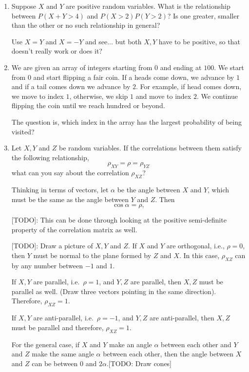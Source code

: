 \documentclass{amsart}
\theoremstyle{plain}
\numberwithin{equation}{section}
\begin{document}
\begin{enumerate}
\item Suppose $X$ and $Y$ are positive 
random variables. What is the relationship between
$P(X+Y>4)$ and $P(X>2)P(Y>2)$? Is one greater, smaller
than the other or no such relationship in general?

Use $X=Y$ and $X=-Y$ and see... but both $X,Y$ 
have to be positive, so that doesn't really work or does it?

\item We are given an array of integers starting 
from $0$ and ending at $100$. We start from $0$ and 
start flipping a fair coin. If a heads come down, 
we advance by $1$ and if a tail comes down 
we advance by $2$. For example, if head comes down, we move
to index $1$, otherwise, we skip $1$ and move to index $2$. 
We continue flipping the coin until we 
reach hundred or beyond. 

The question is, which index in the array has the 
largest probability of being visited?  


 
\item Let $X, Y$ and $Z$ be random 
variables. If the correlations between 
them satisfy the following relationship,
$$\rho_{XY} = \rho = \rho_{YZ}$$
what can you say about the correlation
$\rho_{XZ}$?

Thinking in terms of vectors, let $\alpha$ be 
the angle between $X$ and $Y$, which must be the 
same as the angle between $Y$ and $Z$. Then
$$\cos \alpha = \rho,$$

[TODO]: This can be done through looking at
the positive semi-definite property of the correlation matrix as 
well.

[TODO]: Draw a picture of $X, Y$ and $Z$.
If $X$ and $Y$ are orthogonal, i.e., $\rho = 0$, 
then $Y$ must be normal to the plane 
formed by $Z$ and $X$. In this case, $\rho_{XZ}$ can 
by any number between $-1$ and $1$. 

If $X, Y$ are parallel, i.e.\ $\rho = 1$, and 
$Y, Z$ are parallel, then $X, Z$ must be parallel 
as well. (Draw three vectors pointing in the 
same direction). Therefore, $\rho_{XZ} = 1$.

If $X,Y$ are anti-parallel, i.e.\ $\rho = -1$, and 
$Y, Z$ are anti-parallel, then $X, Z$ must be 
parallel and therefore, $\rho_{XZ}=1$.

For the general case, if $X$ and $Y$ make an angle 
$\alpha$ between each other and $Y$ and $Z$ make the 
same angle $\alpha$ between each other, 
then the angle between $X$ and $Z$ can be between 
$0$ and $2\alpha$.[TODO: Draw cones]


\end{enumerate}
\end{document}
